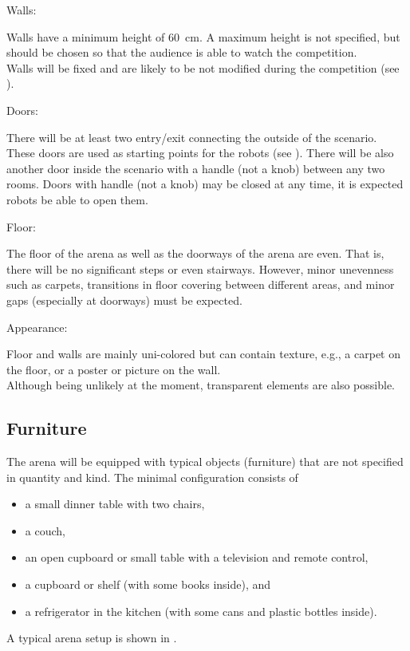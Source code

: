 \begin{enumerate}
	{\bf\item Walls:} Walls have a minimum height of \SI{60}{\centi\meter}. A maximum height is not specified, but should be chosen so that the audience is able to watch the competition.\\
	Walls will be fixed and are likely to be not modified during the competition (see ). 

	{\bf\item Doors:} There will be at least two entry/exit  connecting the outside of the scenario. These doors are used as starting points for the robots (see ).
	There will be also another door inside the scenario with a handle (not a knob) between any two rooms. Doors with handle (not a knob) may be closed at any time, it is expected robots be able to open them.

	{\bf\item Floor:} The floor of the arena as well as the doorways of the arena are even. That is, there will be no significant steps or even stairways. However, minor unevenness such as carpets, transitions in floor covering between different areas, and minor gaps (especially at doorways) must be expected.

	{\bf\item Appearance:} Floor and walls are mainly uni-colored but can contain texture, e.g., a carpet on the floor, or a poster or picture on the wall.\\
	Although being unlikely at the moment, transparent elements are also possible. 
\end{enumerate}


\subsection{Furniture}
\label{rule:scenario_furniture}

The arena will be equipped with typical objects (furniture) that are not specified in quantity and kind. The minimal configuration consists of 
\begin{itemize}
	\item a small dinner table with two chairs, 
	\item a couch, 
	\item an open cupboard or small table with a television and remote control, 
	\item a cupboard or shelf (with some books inside), and
	\item a refrigerator in the kitchen (with some cans and plastic bottles inside). 
\end{itemize}
A typical arena setup is shown in .

